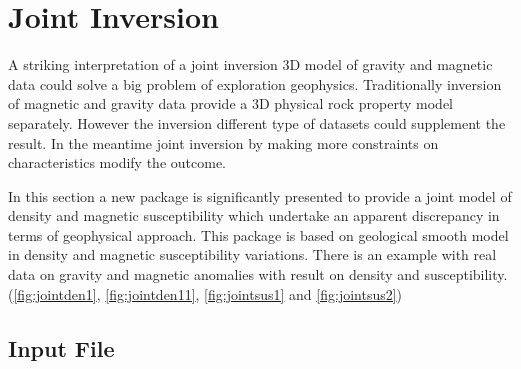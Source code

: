 \chapter{Joint Inversion}\label{Chp:cook:joint inversion}


A striking interpretation of a joint inversion 3D model of gravity and magnetic data could solve a big problem of exploration geophysics. Traditionally inversion of magnetic and gravity data provide a 3D physical rock property model separately. However the inversion different type of datasets could supplement the result. In the meantime joint inversion by making more constraints on characteristics modify the outcome.

In this section a new package is significantly presented to provide a joint model of density and magnetic susceptibility which undertake an apparent discrepancy in terms of geophysical approach. This package is based on geological smooth model in density and magnetic susceptibility variations. There is an example with real data on gravity and magnetic anomalies with result on density and susceptibility.(\ref{fig:jointden1}, \ref{fig:jointden11}, \ref{fig:jointsus1} and \ref{fig:jointsus2})


% 
% 
% 
% 


\section{Input File} 

